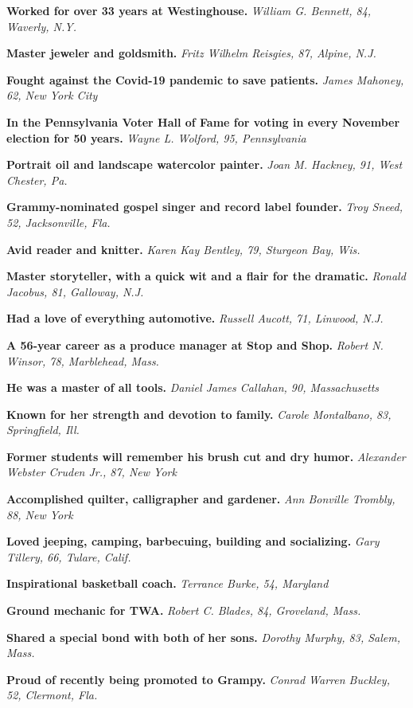 \textbf{Worked for over 33 years at Westinghouse.} \emph{William G.
Bennett, 84, Waverly, N.Y.}

\textbf{Master jeweler and goldsmith.} \emph{Fritz Wilhelm Reisgies, 87,
Alpine, N.J.}

\textbf{Fought against the Covid-19 pandemic to save patients.}
\emph{James Mahoney, 62, New York City}

\textbf{In the Pennsylvania Voter Hall of Fame for voting in every
November election for 50 years.} \emph{Wayne L. Wolford, 95,
Pennsylvania}

\textbf{Portrait oil and landscape watercolor painter.} \emph{Joan M.
Hackney, 91, West Chester, Pa.}

\textbf{Grammy-nominated gospel singer and record label founder.}
\emph{Troy Sneed, 52, Jacksonville, Fla.}

\textbf{Avid reader and knitter.} \emph{Karen Kay Bentley, 79, Sturgeon
Bay, Wis.}

\textbf{Master storyteller, with a quick wit and a flair for the
dramatic.} \emph{Ronald Jacobus, 81, Galloway, N.J.}

\textbf{Had a love of everything automotive.} \emph{Russell Aucott, 71,
Linwood, N.J.}

\textbf{A 56-year career as a produce manager at Stop and Shop.}
\emph{Robert N. Winsor, 78, Marblehead, Mass.}

\textbf{He was a master of all tools.} \emph{Daniel James Callahan, 90,
Massachusetts}

\textbf{Known for her strength and devotion to family.} \emph{Carole
Montalbano, 83, Springfield, Ill.}

\textbf{Former students will remember his brush cut and dry humor.}
\emph{Alexander Webster Cruden Jr., 87, New York}

\textbf{Accomplished quilter, calligrapher and gardener.} \emph{Ann
Bonville Trombly, 88, New York}

\textbf{Loved jeeping, camping, barbecuing, building and socializing.}
\emph{Gary Tillery, 66, Tulare, Calif.}

\textbf{Inspirational basketball coach.} \emph{Terrance Burke, 54,
Maryland}

\textbf{Ground mechanic for TWA.} \emph{Robert C. Blades, 84, Groveland,
Mass.}

\textbf{Shared a special bond with both of her sons.} \emph{Dorothy
Murphy, 83, Salem, Mass.}

\textbf{Proud of recently being promoted to Grampy.} \emph{Conrad Warren
Buckley, 52, Clermont, Fla.}

